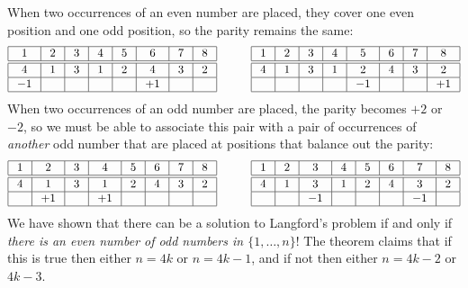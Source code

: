 When two occurrences of an even number are placed, they cover one even position and one odd position, so the parity remains the same:
\[
\addtolength{\arraycolsep}{1mm}
\begin{array}{|c|c|c|c|c|c|c|c|}
\hline
1&2&3&4&5&6&7&8\\
\hline\hline
4&1&3&1&2&4&3&2\\\hline
-1&&&&&+1&&\\\hline
\end{array}
\hspace{3em}
\begin{array}{|c|c|c|c|c|c|c|c|}
\hline
1&2&3&4&5&6&7&8\\
\hline\hline
4&1&3&1&2&4&3&2\\\hline
&&&&-1&&&+1\\\hline
\end{array}
\]
When two occurrences of an odd number are placed, the parity becomes $+2$ or $-2$, so we must be able to associate this pair with a pair of occurrences of \emph{another} odd number that are placed at positions that balance out the parity:
\[
\addtolength{\arraycolsep}{1mm}
\begin{array}{|c|c|c|c|c|c|c|c|}
\hline
1&2&3&4&5&6&7&8\\
\hline\hline
4&1&3&1&2&4&3&2\\\hline
&+1&&+1&&&&\\\hline
\end{array}
\hspace{3em}
\begin{array}{|c|c|c|c|c|c|c|c|}
\hline
1&2&3&4&5&6&7&8\\
\hline\hline
4&1&3&1&2&4&3&2\\\hline
&&-1&&&&-1&\\\hline
\end{array}
\]
We have shown that there can be a solution to Langford's problem if and only if \emph{there is an even number of odd numbers in $\{1,\ldots,n\}$}!
The theorem claims that if this is true then either $n=4k$ or $n=4k-1$, and if not then either $n=4k-2$ or $4k-3$.


